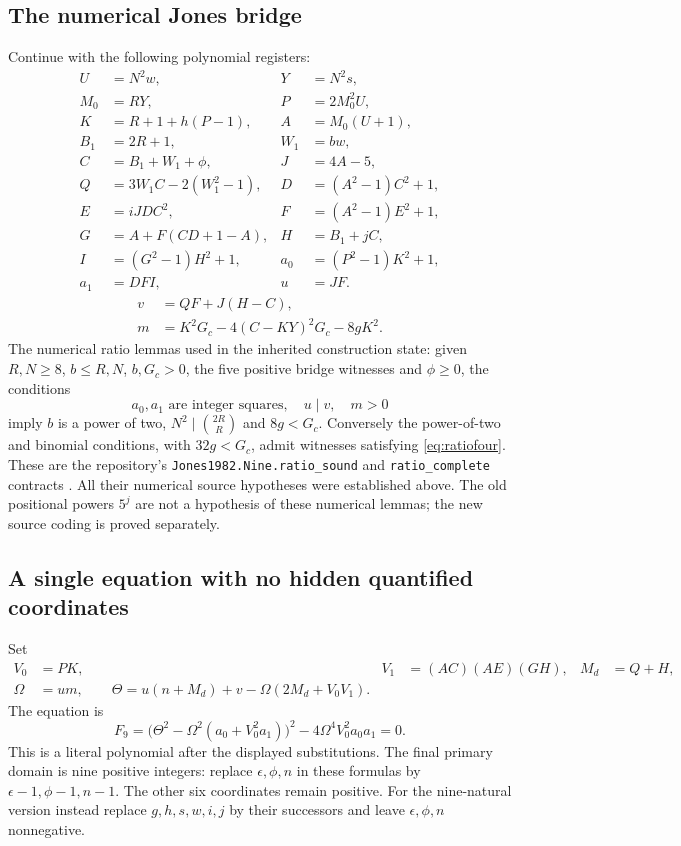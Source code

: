 \subsection{The numerical Jones bridge}
Continue with the following polynomial registers:
\begin{align*}
 U&=N^2w,&Y&=N^2s,\\
 M_0&=RY,&P&=2M_0^2U,\\
 K&=R+1+h(P-1),&A&=M_0(U+1),\\
 B_1&=2R+1,&W_1&=bw,\\
 C&=B_1+W_1+\phi,&J&=4A-5,\\
 Q&=3W_1C-2(W_1^2-1),&D&=(A^2-1)C^2+1,\\
 E&=iJDC^2,&F&=(A^2-1)E^2+1,\\
 G&=A+F(CD+1-A),&H&=B_1+jC,\\
 I&=(G^2-1)H^2+1,&a_0&=(P^2-1)K^2+1,\\
 a_1&=DFI,&u&=JF.
\end{align*}
\begin{align*}
 v&=QF+J(H-C),\\
 m&=K^2G_c-4(C-KY)^2G_c-8gK^2.
\end{align*}
The numerical ratio lemmas used in the inherited construction state:
given $R,N\ge8$, $b\le R,N$, $b,G_c>0$, the five positive
bridge witnesses and $\phi\ge0$, the conditions
\begin{equation}\label{eq:ratiofour}
a_0,a_1\text{ are integer squares},\quad u\mid v,\quad m>0
\end{equation}
imply $b$ is a power of two,
$N^2\mid\binom{2R}{R}$ and $8g<G_c$.
Conversely the power-of-two and binomial conditions, with $32g<G_c$,
admit witnesses satisfying \eqref{eq:ratiofour}. These are the
repository's \texttt{Jones1982.Nine.ratio\_sound} and
\texttt{ratio\_complete} contracts \cite{jones,package45}.
All their numerical source hypotheses were established above.
The old positional powers $5^j$ are not a hypothesis of these
numerical lemmas; the new source coding is proved separately.

\subsection{A single equation with no hidden quantified coordinates}
Set
\begin{align*}
 V_0&=PK,&V_1&=(AC)(AE)(GH),&M_d&=Q+H,\\
 \Omega&=um,\qquad
 \Theta=u(n+M_d)+v-\Omega(2M_d+V_0V_1).
\end{align*}
The equation is
\begin{equation}\label{eq:F9}
\boxed{F_9=
 \bigl(\Theta^2-\Omega^2(a_0+V_0^2a_1)\bigr)^2
 -4\Omega^4V_0^2a_0a_1=0.}
\end{equation}
This is a literal polynomial after the displayed substitutions.
The final primary domain is nine positive integers: replace
$\epsilon,\phi,n$ in these formulas by $\epsilon-1,\phi-1,n-1$.
The other six coordinates remain positive. For the nine-natural
version instead replace $g,h,s,w,i,j$ by their successors and leave
$\epsilon,\phi,n$ nonnegative.

